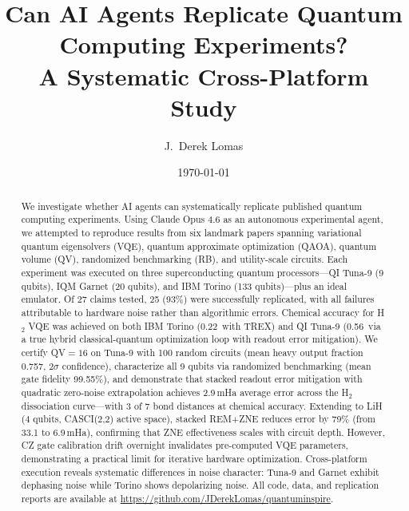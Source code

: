 \documentclass[twocolumn,prl,superscriptaddress,nofootinbib]{revtex4-2}
\newcommand{\kcalmol}{\,\text{kcal/mol}}
\begin{document}
\title{Can AI Agents Replicate Quantum Computing Experiments?\\A Systematic Cross-Platform Study}

\author{J.~Derek Lomas}

\date{\today}

\begin{abstract}
We investigate whether AI agents can systematically replicate published quantum computing experiments.
Using Claude Opus 4.6 as an autonomous experimental agent, we attempted to reproduce results from six landmark papers spanning variational quantum eigensolvers (VQE), quantum approximate optimization (QAOA), quantum volume (QV), randomized benchmarking (RB), and utility-scale circuits.
Each experiment was executed on three superconducting quantum processors---QI Tuna-9 (9 qubits), IQM Garnet (20 qubits), and IBM Torino (133 qubits)---plus an ideal emulator.
Of 27 claims tested, 25 (93\%) were successfully replicated, with all failures attributable to hardware noise rather than algorithmic errors.
Chemical accuracy for H$_2$ VQE was achieved on both IBM Torino (0.22\kcalmol{} with TREX) and QI Tuna-9 (0.56\kcalmol{} via a true hybrid classical-quantum optimization loop with readout error mitigation).
We certify QV${}=16$ on Tuna-9 with 100 random circuits (mean heavy output fraction 0.757, $2\sigma$ confidence), characterize all 9 qubits via randomized benchmarking (mean gate fidelity 99.55\%), and demonstrate that stacked readout error mitigation with quadratic zero-noise extrapolation achieves 2.9\,mHa average error across the H$_2$ dissociation curve---with 3 of 7 bond distances at chemical accuracy.
Extending to LiH (4 qubits, CASCI(2,2) active space), stacked REM+ZNE reduces error by 79\% (from 33.1 to 6.9\,mHa), confirming that ZNE effectiveness scales with circuit depth.
However, CZ gate calibration drift overnight invalidates pre-computed VQE parameters, demonstrating a practical limit for iterative hardware optimization.
Cross-platform execution reveals systematic differences in noise character: Tuna-9 and Garnet exhibit dephasing noise while Torino shows depolarizing noise.
All code, data, and replication reports are available at \url{https://github.com/JDerekLomas/quantuminspire}.
\end{abstract}

\maketitle
\end{document}
